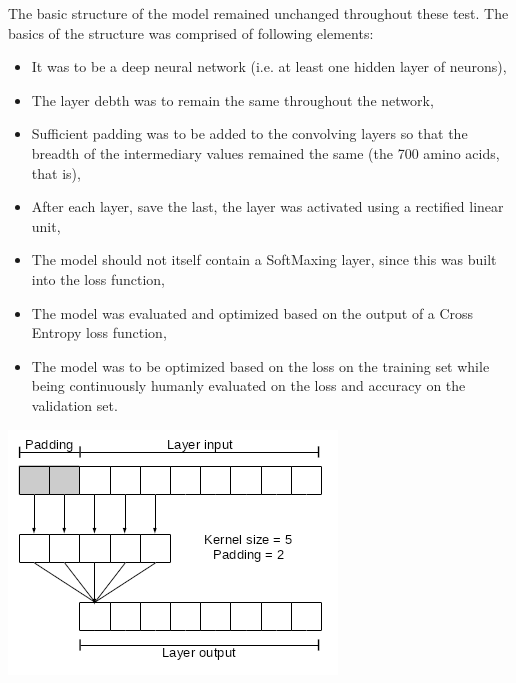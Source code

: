 \begin{multicols}{2}
The basic structure of the model remained unchanged throughout these test. The basics of the structure was comprised of following elements:
\begin{itemize}
\item It was to be a deep neural network (i.e. at least one hidden layer of neurons),
\item The layer debth was to remain the same throughout the network,
\item Sufficient padding was to be added to the convolving layers so that the breadth of the intermediary values remained the same (the 700 amino acids, that is),
\item After each layer, save the last, the layer was activated using a rectified linear unit,
\item The model should not itself contain a SoftMaxing layer, since this was built into the loss function,
\item The model was evaluated and optimized based on the output of a Cross Entropy loss function,
\item The model was to be optimized based on the loss on the training set while being continuously humanly evaluated on the loss and accuracy on the validation set.
\end{itemize}

\begin{Figure}
 \centering
 \includegraphics[width=\linewidth]{../graphs/padding}
 \captionsetup{width=0.8\linewidth, font=small}
\end{Figure}


\end{multicols}
